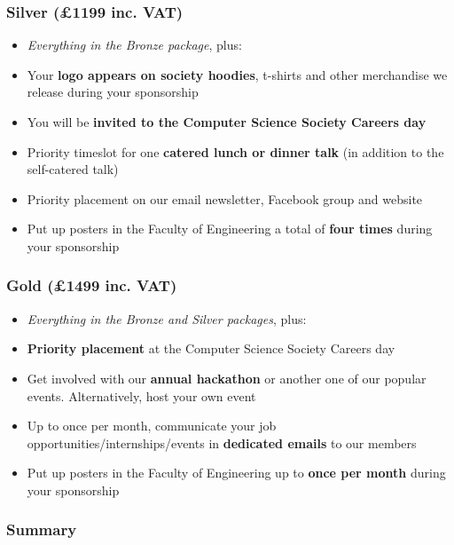 \documentclass[]{article}
\begin{document}
\subsubsection*{Silver {\color{Gray}(\pounds 1199 inc. VAT)}}

\begin{itemize}
	\item \emph{Everything in the Bronze package}, plus:
	\item Your \textbf{logo appears on society hoodies}, t-shirts and other merchandise we release during your sponsorship
	\item You will be \textbf{invited to the Computer Science Society Careers day}
	\item Priority timeslot for one \textbf{catered lunch or dinner talk} (in addition to the self-catered talk)
	\item Priority placement on our email newsletter, Facebook group and website
	\item Put up posters in the Faculty of Engineering a total of \textbf{four times} during your sponsorship
\end{itemize}

\subsubsection*{Gold {\color{Goldenrod}(\pounds 1499 inc. VAT)}}

\begin{itemize}
	\item \emph{Everything in the Bronze and Silver packages}, plus:
	\item \textbf{Priority placement} at the Computer Science Society Careers day
	\item Get involved with our \textbf{annual hackathon} or another one of our popular events. Alternatively, host your own event
	\item Up to once per month, communicate your job opportunities/internships/events in \textbf{dedicated emails} to our members
	\item Put up posters in the Faculty of Engineering up to \textbf{once per month} during your sponsorship
\end{itemize}

\subsubsection*{Summary}

\def\arraystretch{1.5}
\end{document}
